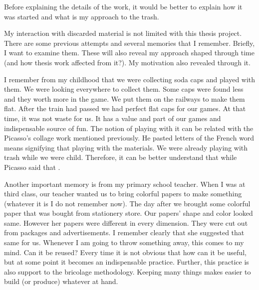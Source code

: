 




Before explaining the details of the work, it would be better to explain how it was started and what is my approach to the trash. %

My interaction with discarded material is not limited with this thesis project. There are some previous attempts and several memories that I remember. Briefly, I want to examine them. These will also reveal my approach shaped through time (and how thesis work affected from it?). My motivation also revealed through it.

I remember from my childhood that we were collecting soda caps and played with them. We were looking everywhere to collect them. Some caps were found less and they worth more in the game. We put them on the railways to make them flat. After the train had passed we had perfect flat caps for our games. At that time, it was not waste for us. It has a value and part of our games and indispensable source of fun. The notion of playing with it can be related with the Picasso's collage work  mentioned previously. He pasted letters of the French word  means  signifying that playing with the materials. We were already playing with trash while we were child. Therefore, it can be better understand that while Picasso said that .

Another important memory is from my primary school teacher. When I was at third class, our teacher wanted us to bring colorful papers to make something (whatever it is I do not remember now). The day after we brought some colorful paper that was bought from stationery store. Our papers' shape and color looked same. However her papers were different in every dimension. They were cut out from packages and advertisements. I remember clearly that she suggested that same for us.  Whenever I am going to throw something away, this comes to my mind. Can it be reused? Every time it is not obvious that how can it be useful, but at some point it becomes an indispensable practice. Further, this practice is also support to the bricolage methodology. Keeping many things makes easier to build (or produce) whatever at hand. 

